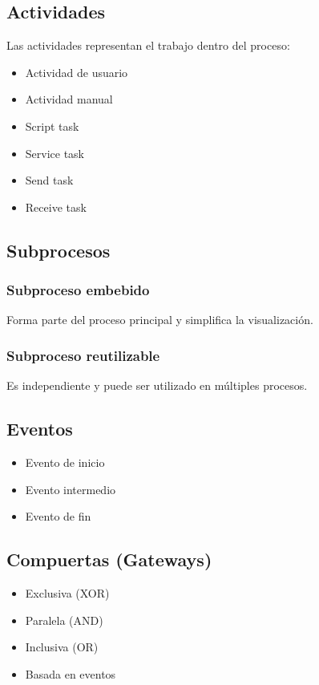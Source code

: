 \documentclass[12pt,a4paper]{article}
\begin{document}
\subsection{Actividades}

Las actividades representan el trabajo dentro del proceso:

\begin{itemize}
    \item Actividad de usuario
    \item Actividad manual
    \item Script task
    \item Service task
    \item Send task
    \item Receive task
\end{itemize}

\subsection{Subprocesos}

\subsubsection{Subproceso embebido}

Forma parte del proceso principal y simplifica la visualización.

\subsubsection{Subproceso reutilizable}

Es independiente y puede ser utilizado en múltiples procesos.

\subsection{Eventos}

\begin{itemize}
    \item Evento de inicio
    \item Evento intermedio
    \item Evento de fin
\end{itemize}

\subsection{Compuertas (Gateways)}

\begin{itemize}
    \item Exclusiva (XOR)
    \item Paralela (AND)
    \item Inclusiva (OR)
    \item Basada en eventos
\end{itemize}
\end{document}
